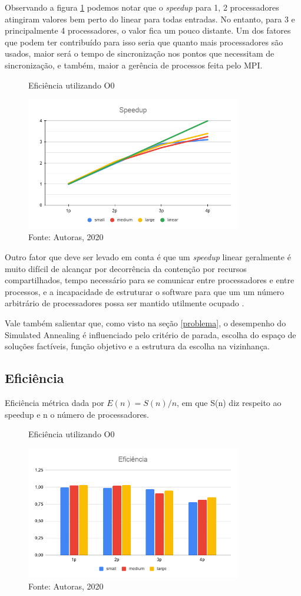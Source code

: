 \documentclass[journal]{IEEEtran}
\begin{document}
Observando a figura \ref{fig:speedup} podemos notar que o \textit{speedup} para 1, 2 processadores atingiram valores bem perto do linear para todas entradas. No entanto, para 3 e principalmente 4 processadores, o valor fica um pouco distante. Um dos fatores que podem ter contribuído para isso seria que quanto mais processadores são usados, maior será o tempo de sincronização nos pontos que necessitam de sincronização, e também, maior a gerência de processos feita pelo MPI.
\begin{figure}[H]
    \centering
    \caption{Eficiência utilizando O0}
    \includegraphics[width=3.7in]{imagens/speedup.png}
    \caption*{Fonte: Autoras, 2020}
    \label{fig:speedup}
\end{figure}

Outro fator que deve ser levado em conta é que um \textit{speedup} linear geralmente é muito difícil de alcançar por decorrência da contenção por recursos compartilhados, tempo necessário para se comunicar entre processadores e entre processos, e a incapacidade de estruturar o software para que um um número arbitrário de processadores possa ser mantido utilmente ocupado \cite{Eager}.

Vale também salientar que, como visto na seção \ref{problema}, o desempenho do Simulated Annealing  é influenciado pelo critério de parada,  escolha do espaço de soluções factíveis, função objetivo e a estrutura da escolha na vizinhança.

\subsection{Eficiência}
Eficiência métrica dada por $E(n) = S(n)/n$, em que S(n) diz respeito ao speedup e n o número de processadores.

\begin{figure}[H]
    \centering
    \caption{Eficiência utilizando O0}
    \includegraphics[width=3.7in]{imagens/eficiencia.png}
    \caption*{Fonte: Autoras, 2020}
    \label{fig:eficiencia}
\end{figure}
\end{document}
